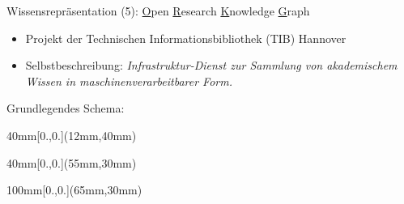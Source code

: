 \documentclass[
	ngerman,
	10pt,				%
	aspectratio=169 	%
]{beamer}
\newcommand{\backupbegin}{
   \newcounter{finalframe}
   \setcounter{finalframe}{\value{framenumber}}
}
\begin{document}
\backupbegin




\begin{frame}[t,fragile,label=wr8]{\large Wissensrepräsentation (5): \underline{O}pen \underline{R}esearch \underline{K}nowledge \underline{G}raph}

  \begin{itemize}
  \item Projekt der Technischen Informationsbibliothek (TIB) Hannover
   \item Selbstbeschreibung: \textit{Infrastruktur-Dienst zur Sammlung von akademischem Wissen in maschinenverarbeitbarer Form.} 
  \end{itemize}

  \pause
  \medskip
Grundlegendes Schema:
  
  
  \begin{textblock*}{40mm}[0.,0.](12mm,40mm)
\end{textblock*}

\begin{textblock*}{40mm}[0.,0.](55mm,30mm)
\end{textblock*}
  

\begin{textblock*}{100mm}[0.,0.](65mm,30mm)
\end{textblock*}
\end{frame}
\end{document}

